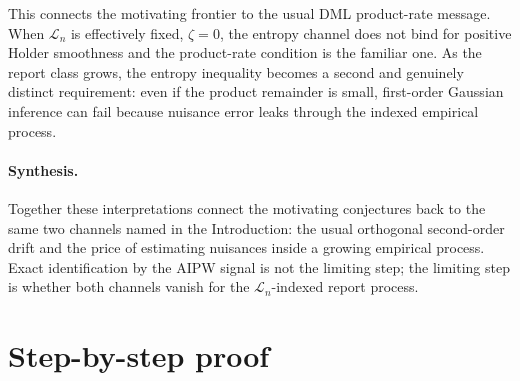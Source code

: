 \documentclass[11pt]{article}
\theoremstyle{definition}
\theoremstyle{plain}
\theoremstyle{remark}
\begin{document}
This connects the motivating frontier to the usual DML product-rate message.
When \(\mathcal L_n\) is effectively fixed, \(\zeta=0\), the entropy channel
does not bind for positive Holder smoothness and the product-rate condition is
the familiar one.  As the report class grows, the entropy inequality becomes a
second and genuinely distinct requirement: even if the product remainder is
small, first-order Gaussian inference can fail because nuisance error leaks
through the indexed empirical process.

\paragraph{Synthesis.}
Together these interpretations connect the motivating conjectures back to the
same two channels named in the Introduction: the usual orthogonal
second-order drift and the price of estimating nuisances inside a growing
empirical process.  Exact identification by the AIPW signal is not the
limiting step; the limiting step is whether both channels vanish for the
\(\mathcal{L}_n\)-indexed report process.

\section{Step-by-step proof}
\end{document}
